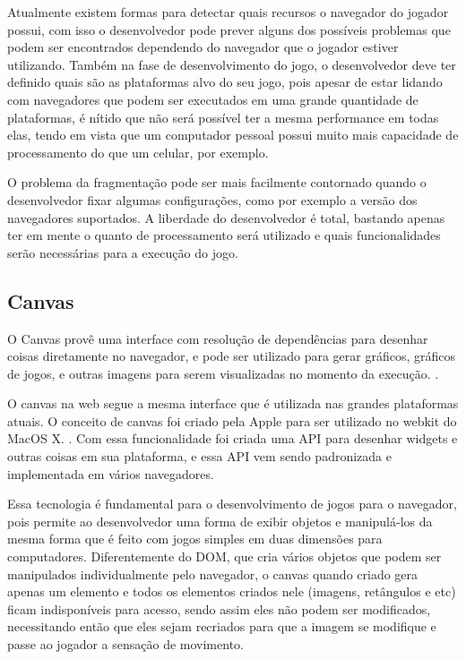 Atualmente existem formas para detectar quais recursos o navegador do
jogador possui, com isso o desenvolvedor pode prever alguns dos
possíveis problemas que podem ser encontrados dependendo do navegador
que o jogador estiver utilizando. Também na fase de desenvolvimento
do jogo, o desenvolvedor deve ter
definido quais são as plataformas alvo do seu jogo, pois apesar de
estar lidando com navegadores que podem ser executados em uma grande
quantidade de plataformas, é nítido que não será possível ter a mesma
performance em todas elas, tendo em vista que um computador pessoal
possui muito mais capacidade de processamento do que um celular, por
exemplo.

O problema da fragmentação pode ser mais facilmente contornado quando
o desenvolvedor fixar algumas configurações, como por exemplo a versão
dos navegadores suportados. A liberdade do desenvolvedor é total,
bastando apenas ter em mente o quanto de processamento será utilizado
e quais funcionalidades serão necessárias para a execução do jogo.

\subsection{Canvas}

O Canvas provê uma interface com resolução de dependências para
desenhar coisas diretamente no navegador, e pode ser utilizado para
gerar gráficos, gráficos de jogos, e outras imagens para serem
visualizadas no momento da execução. \cite{website:w3ccanvas}.

O canvas na web segue a mesma interface que é utilizada nas grandes
plataformas atuais. O conceito de canvas foi criado pela Apple para
ser utilizado no webkit do MacOS X. \cite{lubbers2010pro}. Com essa
funcionalidade foi criada uma API
para desenhar widgets e outras coisas em sua plataforma, e essa API
vem sendo padronizada e implementada em vários navegadores.

Essa tecnologia é fundamental para o desenvolvimento de jogos para
o navegador, pois permite ao desenvolvedor uma forma de exibir
objetos e manipulá-los da mesma forma que é feito com jogos
simples em duas dimensões para computadores.
Diferentemente do DOM, que cria vários objetos que podem ser
manipulados individualmente pelo navegador, o canvas quando criado
gera apenas um elemento e todos os elementos criados
nele (imagens, retângulos e etc) ficam indisponíveis para acesso,
sendo assim eles não podem ser modificados, necessitando então que
eles sejam recriados para que a imagem se modifique e passe ao jogador
a sensação de movimento.

